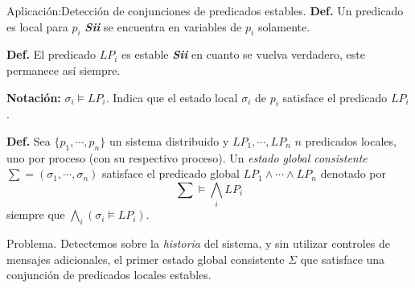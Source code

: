 \begin{frame}[fragile]{Aplicación:}{Detección de conjunciones de predicados estables.}
  \justifying
  \textbf{Def.} Un predicado es local para $p_i$ \textit{\textbf{Sii}}
  se encuentra en variables de $p_i$ solamente.
  
  \textbf{Def.} El predicado $LP_i$ es estable \textit{\textbf{Sii}}
  en cuanto se vuelva verdadero, este permanece así siempre.
  
  \textbf{Notación:} $\sigma_i \models LP_i$. Indica que el estado local $\sigma_i$
  de $p_i$ satisface el predicado $LP_i$.
  
  \textbf{Def.} Sea $\{p_1, \dotsm, p_n\}$ un sistema distribuido y $LP_1, \dotsm, LP_n$ $n$
  predicados locales, uno por proceso (con su respectivo proceso). Un \textit{estado global
  consistente} $\sum = (\sigma_1, \dotsm, \sigma_n)$ satisface el predicado global
  $LP_1 \land \dotsm \land LP_n$ denotado por
  \[\sum \models \bigwedge_i LP_i\]
  siempre que $\bigwedge_i (\sigma_i \models LP_i)$.
  \begin{center}
    \begin{minipage}[b]{0.5\textwidth}
      \begin{exampleblock}{Problema.}
        \justifying
        Detectemos sobre la \textit{historia} del sistema, y sin utilizar controles de mensajes
        adicionales, el primer estado global consistente $\Sigma$ que satisface una conjunción
        de predicados locales estables.
      \end{exampleblock}    
    \end{minipage}
  \end{center}
\end{frame}
